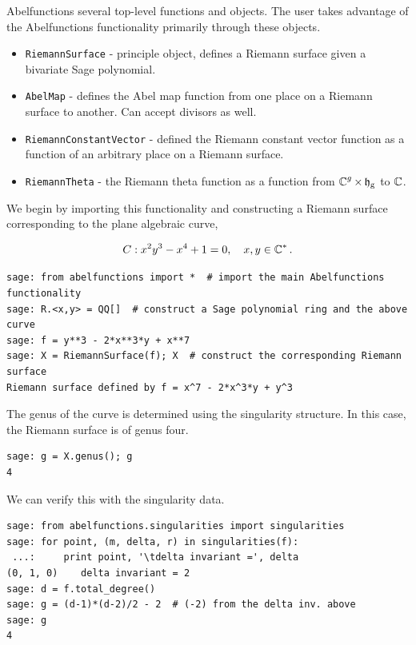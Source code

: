 Abelfunctions several top-level functions and objects. The user takes advantage
of the Abelfunctions functionality primarily through these objects.
\begin{itemize}
  \item {\tt RiemannSurface} - principle object, defines a Riemann surface given
    a bivariate Sage polynomial.
  \item {\tt AbelMap} - defines the Abel map function from one place on a
    Riemann surface to another. Can accept divisors as well.
  \item {\tt RiemannConstantVector} - defined the Riemann constant vector
    function as a function of an arbitrary place on a Riemann surface.
  \item {\tt RiemannTheta} - the Riemann theta function as a function from
    $\operatorname{\mathbb{C}}^g \times \operatorname{\mathfrak{h}_g}$ to $\operatorname{\mathbb{C}}$.
\end{itemize}

\noindent We begin by importing this functionality and constructing a Riemann
surface corresponding to the plane algebraic curve,

\[
  C : x^2y^3 - x^4 + 1 = 0, \quad x,y \in \operatorname{\mathbb{C}}^*.
\]

\begin{lstlisting}[language=Sage]
sage: from abelfunctions import *  # import the main Abelfunctions functionality
sage: R.<x,y> = QQ[]  # construct a Sage polynomial ring and the above curve
sage: f = y**3 - 2*x**3*y + x**7
sage: X = RiemannSurface(f); X  # construct the corresponding Riemann surface
Riemann surface defined by f = x^7 - 2*x^3*y + y^3
\end{lstlisting}

\noindent The genus of the curve is determined using the singularity structure.
In this case, the Riemann surface is of genus four.

\begin{lstlisting}[language=Sage]
sage: g = X.genus(); g
4
\end{lstlisting}

\noindent We can verify this with the singularity data.

\begin{lstlisting}[language=Sage]
sage: from abelfunctions.singularities import singularities
sage: for point, (m, delta, r) in singularities(f):
 ...:     print point, '\tdelta invariant =', delta
(0, 1, 0)    delta invariant = 2
sage: d = f.total_degree()
sage: g = (d-1)*(d-2)/2 - 2  # (-2) from the delta inv. above
sage: g
4
\end{lstlisting}

